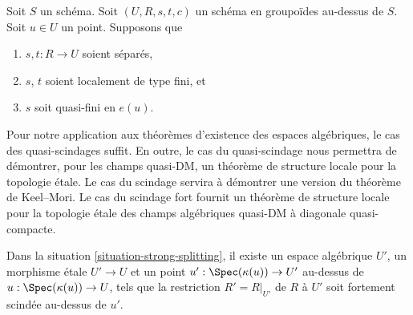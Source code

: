 \begin{situation}
\label{situation-quasi-splitting}
Soit $S$ un schéma.
Soit $(U, R, s, t, c)$ un schéma en groupoïdes au-dessus de $S$.
Soit $u \in U$ un point. Supposons que
\begin{enumerate}
\item $s, t : R \to U$ soient séparés,
\item $s$, $t$ soient localement de type fini, et
\item $s$ soit quasi-fini en $e(u)$.
\end{enumerate}
\end{situation}

\noindent
Pour notre application aux théorèmes d'existence des espaces algébriques,
le cas des quasi-scindages suffit. En outre, le cas du quasi-scindage
nous permettra de démontrer, pour les champs quasi-DM, un théorème de
structure locale pour la topologie \'etale. Le cas du scindage servira à démontrer une version
du théorème de Keel--Mori. Le cas du scindage fort fournit
un théorème de structure locale pour la topologie \'etale des champs
algébriques quasi-DM à diagonale quasi-compacte.

\begin{lemma}
\label{lemma-strong-splitting}
Dans la situation \ref{situation-strong-splitting},
il existe un espace algébrique $U'$, un morphisme \'etale
$U' \to U$ et un point $u' : \Spec(\kappa(u)) \to U'$
au-dessus de $u : \Spec(\kappa(u)) \to U$,
tels que la restriction $R' = R|_{U'}$ de $R$ à $U'$
soit fortement scindée au-dessus de $u'$.
\end{lemma}

